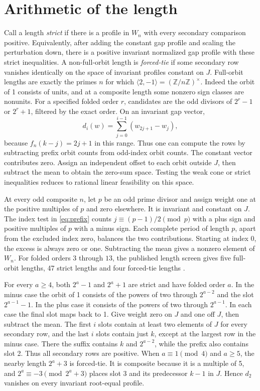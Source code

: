 \documentclass[11pt,reqno]{amsart}
\theoremstyle{definition}
\newcommand{\Z}{\mathbb Z}
\begin{document}
\section{Arithmetic of the length}\label{sec:lengths}
Call a length \emph{strict} if there is a profile in \(W_n\) with every secondary comparison positive. Equivalently, after adding the constant gap profile and scaling the perturbation down, there is a positive invariant normalized gap profile with these strict inequalities. A non-full-orbit length is \emph{forced-tie} if some secondary row vanishes identically on the space of invariant profiles constant on \(J\). Full-orbit lengths are exactly the primes \(n\) for which \(\langle 2,-1\rangle=(\Z/n\Z)^\times\). Indeed the orbit of 1 consists of units, and at a composite length some nonzero sign classes are nonunits. For a specified folded order \(r\), candidates are the odd divisors of \(2^r-1\) or \(2^r+1\), filtered by the exact order. On an invariant gap vector,
\begin{equation}\label{eq:prefix}
 d_i(w)=\sum_{j=0}^{i-1}(w_{2j+1}-w_j),
\end{equation}
because \(f_n(k-j)=2j+1\) in this range. Thus one can compute the rows by subtracting prefix orbit counts from odd-index orbit counts. The constant vector contributes zero. Assign an independent offset to each orbit outside \(J\), then subtract the mean to obtain the zero-sum space. Testing the weak cone or strict inequalities reduces to rational linear feasibility on this space.

At every odd composite \(n\), let \(p\) be an odd prime divisor and assign weight one at the positive multiples of \(p\) and zero elsewhere. It is invariant and constant on \(J\). The index test in \eqref{eq:prefix} counts \(j\equiv(p-1)/2\pmod p\) with a plus sign and positive multiples of \(p\) with a minus sign. Each complete period of length \(p\), apart from the excluded index zero, balances the two contributions. Starting at index 0, the excess is always zero or one. Subtracting the mean gives a nonzero element of \(W_n\). For folded orders \(3\) through \(13\), the published length screen gives five full-orbit lengths, 47 strict lengths and four forced-tie lengths \cite[Section~4.2]{G9}.


For every \(a\ge4\), both \(2^a-1\) and \(2^a+1\) are strict and have folded order \(a\). In the minus case the orbit of 1 consists of the powers of two through \(2^{a-2}\) and the slot \(2^{a-1}-1\). In the plus case it consists of the powers of two through \(2^{a-1}\). In each case the final slot maps back to 1. Give weight zero on \(J\) and one off \(J\), then subtract the mean. The first \(i\) slots contain at least two elements of \(J\) for every secondary row, and the last \(i\) slots contain just \(k\), except at the largest row in the minus case. There the suffix contains \(k\) and \(2^{a-2}\), while the prefix also contains slot 2. Thus all secondary rows are positive. When \(a\equiv1\pmod4\) and \(a\ge5\), the nearby length \(2^a+3\) is forced-tie. It is composite because it is a multiple of 5, and \(2^a\equiv-3\pmod{2^a+3}\) places slot 3 and its predecessor \(k-1\) in \(J\). Hence \(d_2\) vanishes on every invariant root-equal profile.
\end{document}
